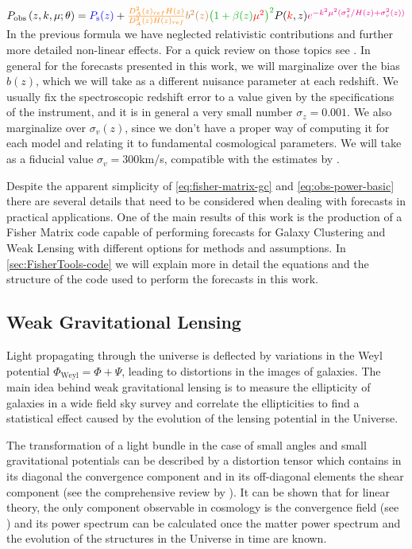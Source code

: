 \beeq$\label{eq:obs-power-basic}
P_{{\rm obs}}\left(z,k,\mu;\theta\right)=\textcolor{blue}{P_{{\rm s}}(z)}+{\color{orange}\frac{D_{A}^{2}(z)_{ref}H(z)}{D_{A}^{2}(z)H(z)_{ref}}}
{\color{brown}b^{2}(z)}
{\color{green}\left(1+\beta(z){\color{red}\mu}^{{\color{red}2}}\right)^{2}}P({\color{red}k},z){\color{magenta}e^{-k^{2}\mu^{2}(\sigma_{z}^{2}/H(z)+\sigma_{v}^{2}(z))}}
$
In the previous formula we have neglected relativistic contributions and further more detailed non-linear effects.
For a quick review on those topics see \cite{durrer, bonvin, taruya, scoccimarro}.
In general for the forecasts presented in this work,
we will marginalize over the bias $b(z)$, which we will take as a different nuisance parameter at each redshift. We usually fix
the spectroscopic redshift error  to a value given by the specifications of the instrument, and it is in general a very small number
$\sigma_{z}=0.001$. We also marginalize over $\sigma_{v}(z)$, 
since we don't have a proper way of computing it for each model and relating it to fundamental cosmological parameters.
We will take as a fiducial value $\sigma_{v} = 300$km/s, compatible with the estimates by \cite{de_la_torre_modelling_2012}.

Despite the apparent 
simplicity of \cref{eq:fisher-matrix-gc} and \cref{eq:obs-power-basic} there
are several details that need to be considered when dealing with forecasts
in practical applications. 
One of the main results of this work is the production of a Fisher Matrix code capable of performing
forecasts for Galaxy Clustering and Weak Lensing with different options for methods and assumptions.
In \cref{sec:FisherTools-code} we will explain more in detail the equations and the structure of the code
used to perform the forecasts in this work.


\subsection{Weak Gravitational Lensing \label{sub:Weak-Lensing-Fisher}}

Light propagating through the universe is deflected by variations in the Weyl potential $\Phi_{\textrm{Weyl}}=\Phi+\Psi$,
leading to distortions in the images of galaxies. 
The main idea behind weak gravitational lensing is to measure the ellipticity of galaxies in a 
wide field sky survey and correlate the ellipticities to find a statistical effect caused by the
evolution of the lensing potential in the Universe.

The transformation of a light bundle in the case of small angles and small gravitational potentials
can be described by a distortion tensor which contains in its diagonal the convergence component and in its
off-diagonal elements the shear component (see the comprehensive review by \cite{cite Bartelmann Schneider}).
It can be shown that for linear theory, the only component observable in cosmology
is the convergence field (see \cite{Amendola, Tegmark, Hu, Bartelmann}) 
and its power spectrum can be calculated once the matter power spectrum and the
evolution of the structures in the Universe in time are known.


